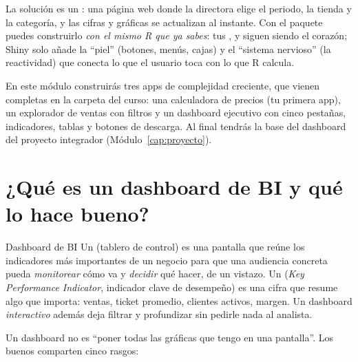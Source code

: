 La solución es un : una página web donde la
directora elige el periodo, la tienda y la categoría, y las cifras y
gráficas se actualizan al instante. Con el paquete  puedes
construirlo \emph{con el mismo R que ya sabes}: tus ,
 y  siguen siendo el corazón; Shiny solo
añade la ``piel'' (botones, menús, cajas) y el ``sistema nervioso'' (la
reactividad) que conecta lo que el usuario toca con lo que R calcula.

En este módulo construirás tres apps de complejidad creciente, que vienen
completas en la carpeta  del curso: una
calculadora de precios (tu primera app), un explorador de ventas con filtros
y un dashboard ejecutivo con cinco pestañas, indicadores, tablas y botones de
descarga. Al final tendrás la base del dashboard del proyecto integrador
(Módulo~\ref{cap:proyecto}).

\section{¿Qué es un dashboard de BI y qué lo hace bueno?}
\label{sec:m6-dashboard}

\begin{concepto}{Dashboard de BI}
Un  (tablero de control) es una pantalla que reúne los
indicadores más importantes de un negocio para que una audiencia concreta
pueda \emph{monitorear} cómo va y \emph{decidir} qué hacer, de un vistazo.
Un  (\emph{Key Performance Indicator}, indicador clave de
desempeño) es una cifra que resume algo que importa: ventas, ticket
promedio, clientes activos, margen. Un dashboard \emph{interactivo} además
deja filtrar y profundizar sin pedirle nada al analista.
\end{concepto}

Un dashboard no es ``poner todas las gráficas que tengo en una pantalla''.
Los buenos comparten cinco rasgos:

